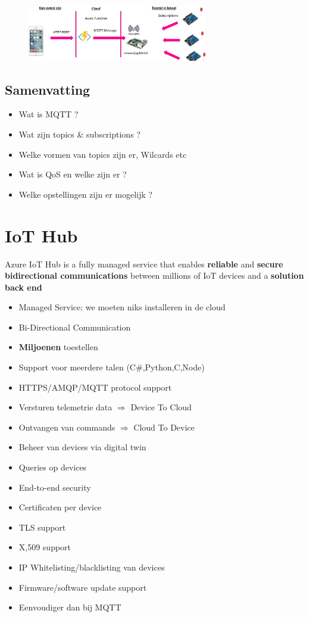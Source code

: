 \documentclass{article}
\newcommand{\bold}[1]{\textbf{#1}}
\begin{document}
\begin{figure}[H]
    \centering
    \includegraphics[width=0.7\textwidth]{mqtt-com5.png}
    \caption{}
\end{figure}

\subsection{Samenvatting}

\begin{itemize}
    \item Wat is MQTT ?
    \item Wat zijn topics \& subscriptions ?
    \item Welke vormen van topics zijn er, Wilcards etc
    \item Wat is QoS en welke zijn er ?
    \item Welke opstellingen zijn er mogelijk ?
\end{itemize}

\section{IoT Hub}

Azure IoT Hub is a fully managed service that enables \bold{reliable} and \bold{secure}
\bold{bidirectional communications} between millions of IoT devices and a
\bold{solution back end}

\begin{itemize}
    \item Managed Service: we moeten niks installeren in de cloud
    \item Bi-Directional Communication
    \item \bold{Miljoenen} toestellen
    \item Support voor meerdere talen (C\#,Python,C,Node)
    \item HTTPS/AMQP/MQTT protocol support
    \item Versturen telemetrie data $\Rightarrow$ Device To Cloud
    \item Ontvangen van commands $\Rightarrow$ Cloud To Device
    \item Beheer van devices via digital twin
    \item Queries op devices
    \item End-to-end security
    \item Certificaten per device
    \item TLS support
    \item X,509 support
    \item IP Whitelisting/blacklisting van devices
    \item Firmware/software update support
    \item Eenvoudiger dan bij MQTT
\end{itemize}
\end{document}
